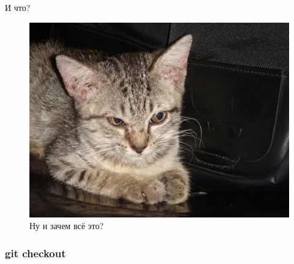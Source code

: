 \documentclass[presentation]{beamer}
\begin{document}
\begin{frame}{И что?}
  \begin{figure}[htb]
    \centering
    \includegraphics[width=.8\textwidth]{kucing-belang-perang}
    \caption{\LARGE Ну и зачем всё это?}
  \end{figure}
\end{frame}



\subsubsection{git checkout}
\end{document}
